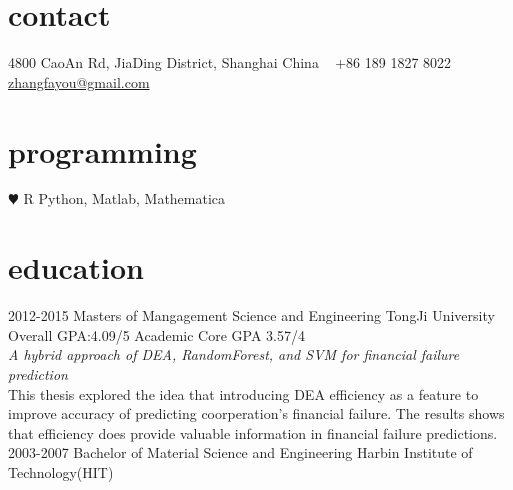 \documentclass[]{friggeri-cv} %
\begin{document}


\begin{aside} %
\section{contact}
4800 CaoAn Rd,
JiaDing District, Shanghai
China
~
+86 189 1827 8022
~
\href{mailto:zhangfayou@gmail.com}{zhangfayou@gmail.com}
\section{programming}
{\color{red} $\varheartsuit$} R
Python, Matlab, Mathematica
\end{aside}


\section{education}

\begin{entrylist}
\entry
{2012-2015}
{Masters {\normalfont of Mangagement Science and Engineering}}
{TongJi University}
{Overall GPA:4.09/5 Academic Core GPA 3.57/4\\
\emph{A hybrid approach of DEA, RandomForest, and SVM for financial failure prediction} \\ This thesis explored the idea that introducing DEA efficiency as a feature to improve accuracy of predicting coorperation's financial failure. The results shows that efficiency does provide valuable information in financial failure predictions.}
\entry
{2003-2007}
{Bachelor {\normalfont of Material Science and Engineering}}
{Harbin Institute of Technology(HIT)}
{}
\end{entrylist}
\end{document}

